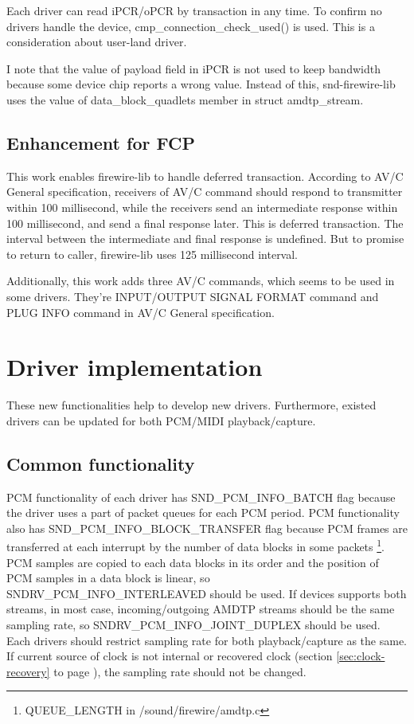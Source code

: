 \documentclass[onecolumn]{article}
\begin{document}
Each driver can read iPCR/oPCR by transaction in any time. To confirm no drivers handle the device, cmp\_connection\_check\_used() is used. This is a consideration about user-land driver.

I note that the value of payload field in iPCR is not used to keep bandwidth because some device chip reports a wrong value. Instead of this, snd-firewire-lib uses the value of data\_block\_quadlets member in struct amdtp\_stream.

\subsection{Enhancement for FCP}

This work enables firewire-lib to handle deferred transaction. According to AV/C General specification\cite{avc-general-4-2}, receivers of AV/C command should respond to transmitter within 100 millisecond, while the receivers send an intermediate response within 100 millisecond, and send a final response later. This is deferred transaction. The interval between the intermediate and final response is undefined. But to promise to return to caller, firewire-lib uses 125 millisecond interval.

Additionally, this work adds three AV/C commands, which seems to be used in some drivers. They're INPUT/OUTPUT SIGNAL FORMAT command and PLUG INFO command in AV/C General specification\cite{avc-general-4-2}.

\section{Driver implementation}

These new functionalities help to develop new drivers. Furthermore, existed drivers can be updated for both PCM/MIDI playback/capture.

\subsection{Common functionality}

PCM functionality of each driver has SND\_PCM\_INFO\_BATCH flag because the driver uses a part of packet queues for each PCM period. PCM functionality also has SND\_PCM\_INFO\_BLOCK\_TRANSFER flag because PCM frames are transferred at each interrupt by the number of data blocks in some packets \footnote{QUEUE\_LENGTH in /sound/firewire/amdtp.c}. PCM samples are copied to each data blocks in its order and the position of PCM samples in a data block is linear, so SNDRV\_PCM\_INFO\_INTERLEAVED should be used. If devices supports both streams, in most case, incoming/outgoing AMDTP streams should be the same sampling rate, so SNDRV\_PCM\_INFO\_JOINT\_DUPLEX should be used. Each drivers should restrict sampling rate for both playback/capture as the same. If current source of clock is not internal or recovered clock (section \ref{sec:clock-recovery} to page \pageref{sec:clock-recovery}), the sampling rate should not be changed.
\end{document}
